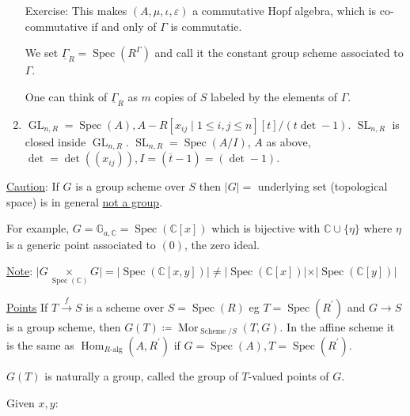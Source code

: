 \documentclass{article}
\theoremstyle{definition}
\numberwithin{theorem}{subsection}
\begin{document}
\begin{enumerate}[label=\arabic*)]
        Exercise: This makes \((A,\mu, \iota, \varepsilon)\) a commutative Hopf algebra, which is co-commutative if and only of \(\Gamma\) is commutatie.

        We set \(\underline{\Gamma}_R = \operatorname{Spec}(R^\Gamma)\) and call it the constant group scheme associated to \(\Gamma\).

        One can think of \(\underline{\Gamma}_R\) as \(m\) copies of \(S\) labeled by the elements of \(\Gamma\).

        \item \(\operatorname{GL}_{n,R}=\operatorname{Spec}(A), A - R[x_{ij} \mid 1 \leq i, j \leq n][t] / (t \det - 1)\). \(\operatorname{SL}_{n,R}\) is closed inside \(\operatorname{GL}_{n,R}\). \(\operatorname{SL}_{n,R} = \operatorname{Spec}(A / I)\), \(A\) as above, \(\det = \det ((x_{ij})), I = (\overline{t} - 1) = (\det - 1)\).

    \end{enumerate} 

    \underline{Caution}: If \(G\) is a group scheme over \(S\) then \(\vert G \vert = \) underlying set (topological space) is in general \underline{not a group}.
        
    For example, \(G = \mathbb{G}_{a,\mathbb{C}} = \operatorname{Spec}(\mathbb{C}[x])\) which is bijective with \(\mathbb{C} \cup \{ \eta \} \) where \(\eta\) is a generic point associated to \((0)\), the zero ideal.

    \underline{Note}: \(\vert G \underset{\operatorname{Spec}(\mathbb{C})}{\times} G \vert = \vert \operatorname{Spec} (\mathbb{C}[x,y]) \vert \neq \vert \operatorname{Spec} (\mathbb{C} [x]) \vert \times \vert \operatorname{Spec}(\mathbb{C}[y]) \vert\) 

    \underline{Points} If \(T \xrightarrow{f} S\) is a scheme over \(S = \operatorname{Spec}(R)\) eg \(T = \operatorname{Spec}(R^{\prime})\) and \(G \to S\) is a group scheme, then \(G(T) \coloneqq \operatorname{Mor}_{\operatorname{Scheme} / S}(T,G)\). In the affine scheme it is the same as \(\operatorname{Hom}_{R \text{-alg}}(A,R^{\prime})\) if \(G = \operatorname{Spec}(A), T = \operatorname{Spec}(R^{\prime})\).
    
    \(G(T)\) is naturally a group, called the group of \(T\)-valued points of \(G\).

    Given \(x,y:\) 
\end{document}
